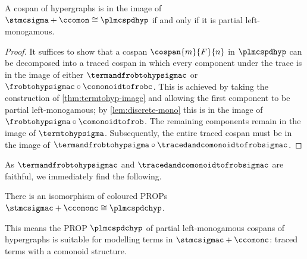 \begin{theorem}\label{thm:comonoid-fully-complete}
    A cospan of hypergraphs is in the image of
    \(\stmcsigma + \ccomon \cong \plmcspdhyp\) if and only if it is partial
    left-monogamous.
\end{theorem}
\begin{proof}
    It suffices to show that a cospan \(\cospan{m}{F}{n}\) in
    \(\plmcspdhyp\) can be decomposed into a traced cospan in which every
    component under the trace is in the image of either
    \(\termandfrobtohypsigmac\) or \(\frobtohypsigmac \circ \comonoidtofrobc\).
    This is achieved by taking the construction of \cref{thm:termtohyp-image}
    and allowing the first component to be partial left-monogamous; by
    \cref{lem:discrete-mono} this is in the image of
    \(\frobtohypsigma \circ \comonoidtofrob\).
    The remaining components remain in the image of \(\termtohypsigma\).
    Subsequently, the entire traced cospan must be in the image of \(
        \termandfrobtohypsigma \circ \tracedandcomonoidtofrobsigmac
    \).
\end{proof}

As \(\termandfrobtohypsigmac\) and \(\tracedandcomonoidtofrobsigmac\) are
faithful, we immediately find the following.

\begin{corollary}
    There is an isomorphism of coloured PROPs
    \(\stmcsigmac + \ccomonc \cong \plmcspdchyp\).
\end{corollary}

This means the PROP \(\plmcspdchyp\) of partial left-monogamous cospans of
hypergraphs is suitable for modelling terms in \(\stmcsigmac + \ccomonc\):
traced terms with a comonoid structure.